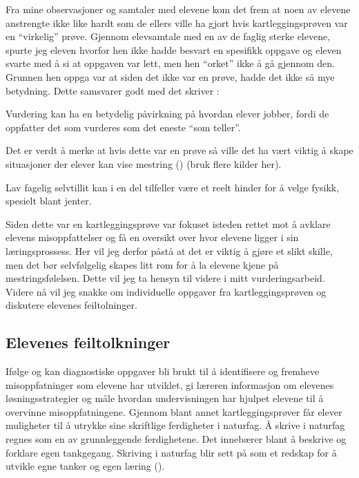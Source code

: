 \documentclass[main.tex]{subfiles}
\begin{document}
Fra mine observasjoner og samtaler med elevene kom det frem at noen av 
elevene anstrengte ikke like hardt som de ellers ville ha gjort hvis kartleggingsprøven var en ``virkelig'' prøve.
Gjennom elevsamtale med en av de faglig sterke elevene, spurte jeg eleven hvorfor hen ikke hadde besvart en spesifikk 
oppgave og eleven svarte med å si at oppgaven var lett, men hen ``orket'' ikke å gå gjennom den. Grunnen hen oppga 
var at siden det ikke var en prøve, hadde det ikke så mye betydning. Dette samsvarer godt med det  
skriver : 
\begin{displayquote}
Vurdering kan ha en betydelig påvirkning på hvordan elever jobber, fordi de oppfatter det som 
vurderes som det eneste ``som teller''.
\end{displayquote}

Det er verdt å merke at hvis dette var 
en prøve så ville det ha vært viktig å skape situasjoner der elever kan vise mestring () (bruk 
flere kilder her). 

Lav fagelig selvtillit kan i en del tilfeller være et reelt hinder for å velge fysikk, spesielt blant jenter.

Siden dette var en kartleggingsprøve var fokuset isteden rettet mot å avklare elevens misoppfattelser og få en oversikt 
over hvor elevene ligger i sin læringsprossess. Her vil jeg derfor påstå at det er viktig å gjøre et slikt skille, men 
det bør selvfølgelig skapes litt rom for å la elevene kjene på mestringsfølelsen. Dette vil jeg ta hensyn til videre i
mitt vurderingsarbeid. Videre nå vil jeg snakke om individuelle oppgaver fra kartleggingsprøven og diskutere 
elevenes feiltolninger.

\subsection*{Elevenes feiltolkninger}
Ifølge  og  kan diagnostiske oppgaver bli brukt til å identifisere og 
fremheve misoppfatninger som elevene har utviklet, gi læreren informasjon om elevenes løsningsstrategier og måle hvordan 
undervisningen har hjulpet elevene til å overvinne misoppfatningene. Gjennom blant annet kartleggingsprøver får elever 
muligheter til å utrykke sine skriftlige ferdigheter i naturfag. Å skrive i naturfag regnes som en av grunnleggende 
ferdighetene. Det innebærer blant å beskrive og forklare egen tankgegang. Skriving i naturfag blir sett på som et redskap for å utvikle egne tanker og egen læring (). 
\end{document}
